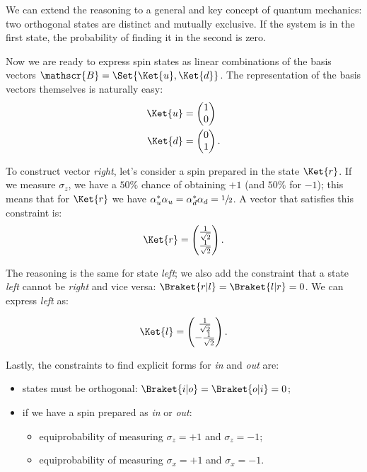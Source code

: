 We  can extend the reasoning to a general and key concept of quantum mechanics: two orthogonal states are distinct and mutually exclusive. If the system is in the first state, the probability of finding it in the second is zero.

Now we are ready to express spin states as linear combinations of the basis vectors $\mathscr{B} = \Set{\Ket{u}, \Ket{d}}$. The representation of the basis vectors themselves is naturally easy:
\begin{align}
	\Ket{u} &= \begin{pmatrix}
		1 \\
		0
	\end{pmatrix}
	\label{eqn:ket_u}\\
	\Ket{d} &= \begin{pmatrix}
		0 \\
		1
	\end{pmatrix}.
	\label{eqn:ket_d}
\end{align}

To construct vector \emph{right}, let's consider a spin prepared in the state $\Ket{r}$. If we measure $\sigma_z$, we have a $50\%$ chance of obtaining $+1$ (and $50\%$ for $-1$); this means that for $\Ket{r}$ we have $\alpha_u^*\alpha_u = \alpha_d^*\alpha_d = \sfrac{1}{2}$. A vector that satisfies this constraint is:
\begin{equation}
	\Ket{r} = \begin{pmatrix}
		\frac{1}{\sqrt{2}} \\
		\frac{1}{\sqrt{2}}
	\end{pmatrix}.
	\label{eqn:ket_r}
\end{equation}

The reasoning is the same for state \emph{left}; we also add the constraint that a state \emph{left} cannot be \emph{right} and vice versa: $\Braket{r|l} = \Braket{l|r} = 0$. We can express \emph{left} as:

\begin{equation}
	\Ket{l} = \begin{pmatrix}
		\frac{1}{\sqrt{2}}\\
		-\frac{1}{\sqrt{2}}
	\end{pmatrix}.
	\label{eqn:ket_l}
\end{equation}

Lastly, the constraints to find explicit forms for \emph{in} and \emph{out} are:
\begin{itemize}
	\item states must be orthogonal: $\Braket{i|o} = \Braket{o|i} = 0$;
	\item if we have a spin prepared as \emph{in} or \emph{out}:
	\begin{itemize}
		\item equiprobability of measuring $\sigma_z = +1$ and $\sigma_z = -1$;
		\item equiprobability of measuring $\sigma_x = +1$ and $\sigma_x = -1$.
	\end{itemize}
\end{itemize}

